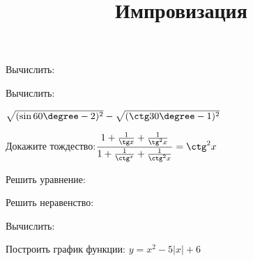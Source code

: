 \begin{listofex}
	\item Вычислить:
	\begin{enumcols}[itemcolumns=2]
		\item {}
		\item {}
		\item {}
		\item {}
		\item {}
		\item {}
	\end{enumcols}
	\item Вычислить:
	\begin{enumcols}[itemcolumns=1]
		\item {}
		\item {}
		\item \( \sqrt{(\sin60\degree-2)^2}-\sqrt{(\ctg30\degree-1)^2} \)
	\end{enumcols}
	\item Докажите тождество:\quad\( \dfrac{1+\frac{1}{\tg x}+\frac{1}{\tg^2x}}{1+\frac{1}{\ctg^x}+\frac{1}{\ctg^2x}}=\ctg^2x \)
	\item {}
	\item {}
	\item Решить уравнение:
	\begin{enumcols}[itemcolumns=2]
		\item {}
		\item {}
		\item {}
		\item {}
	\end{enumcols}
	\item {}
	\item Решить неравенство:
	\begin{enumcols}[itemcolumns=2]
		\item {}
		\item {}
		\item {}
		\item {}
	\end{enumcols}
\end{listofex}
\newpage
\title{Импровизация}
\begin{listofex}
	\item Вычислить:
	\begin{enumcols}[itemcolumns=2]
		\item {}
		\item {}
		\item {}
		\item {}
	\end{enumcols}
	\item Построить график функции: \( y=x^2-5|x|+6 \)
	\item {}
	\item {}
	\item {}
\end{listofex}